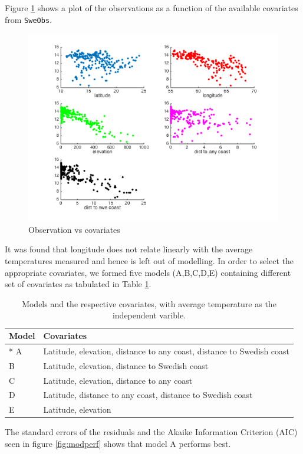 \documentclass[a4paper,10pt]{article}
\begin{document}
Figure \ref{fig:covariates} shows a plot of the observations as a function of the available covariates from {\texttt{SweObs}}.
\begin{figure}[ht]
	\includegraphics[width=0.8\linewidth]{covariates.png}
	\caption{Observation vs covariates}
	\label{fig:covariates}
\end{figure}
It was found that longitude does not relate linearly with the average temperatures measured and hence is left out of modelling. In order to select the appropriate covariates, we formed five models (A,B,C,D,E) containing different set of covariates as tabulated in Table \ref{tab:models}.
\begin{table}[H]
\centering
\begin{tabular}{lp{9cm}}
\hline
{\bf Model} & {\bf Covariates} \\
\hline
* A & Latitude, elevation, distance to any coast, distance to Swedish coast\\
 B & Latitude, elevation, distance to Swedish coast\\
 C & Latitude, elevation, distance to any coast\\
 D & Latitude, distance to any coast, distance to Swedish coast\\
 E & Latitude, elevation\\
\hline
\end{tabular}
\caption{Models and the respective covariates, with average temperature as the independent varible.}
\label{tab:models}
\end{table}
The standard errors of the residuals and the Akaike Information Criterion (AIC) seen in figure \ref{fig:modperf} shows that model A performs best.
\end{document}
